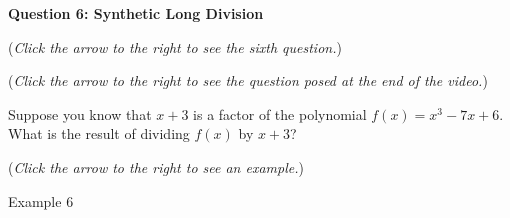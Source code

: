 \documentclass{ximera}
\begin{document}
\textbf{Question 6: Synthetic Long Division}
\begin{question}
\begin{flushright}
{\color{blue}(\emph{Click the arrow to the right to see the sixth question.})}
\end{flushright}
\begin{center}
\begin{expandable}
\begin{flushright}
{\color{blue}(\emph{Click the arrow to the right to see the  question
posed at the end of the video.})}
\end{flushright}
\begin{expandable}
Suppose you know that $x+3$ is a factor of the polynomial $f(x) = x^3 - 7x + 6$. What is the result of dividing $f(x)$ by $x+3$?
\begin{multipleChoice}
\end{multipleChoice}
\begin{flushright}
{\color{blue}(\emph{Click the arrow to the right to see an example.})}
\end{flushright}
\begin{expandable}
\begin{center}
Example 6
\end{center}
\end{expandable}
\end{expandable}
\end{expandable}
\end{center}
\end{question}
\end{document}
